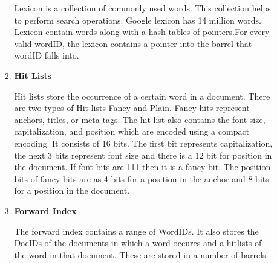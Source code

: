 \documentclass[a4paper, 12pt]{article}
\begin{document}
\begin{enumerate}
\begin{enumerate}
\begin{enumerate}
                Lexicon is a collection of commonly used words. This collection helps to perform search operations. Google lexicon has 14 million words.
                Lexicon contain words along with a hash tables of pointers.For every valid wordID, the lexicon contains a pointer into the barrel that wordID falls into.
            \item \textbf{Hit Lists}            
                Hit lists store the occurrence of a certain word in a document. There are two types of Hit lists Fancy and Plain.
                Fancy hits represent anchors, titles, or meta tags. The hit list also contains the font size, capitalization, and position which are encoded using a compact encoding. It consists of 16 bits. The first bit represents capitalization, the next 3 bits represent font size and there is a 12 bit for position in the document. If font bits are 111 then it is a fancy bit. The position bits of fancy bits are as 4 bits for a position in the anchor and 8 bits for a position in the document.

            \item \textbf{Forward Index}
                The forward index contains a range of WordIDs. It also stores the DocIDs of the documents in which a word occures and a hitlists of the word in that document. These are stored in a number of barrels. 


\end{enumerate}
\end{enumerate}
\end{enumerate}
\end{document}
